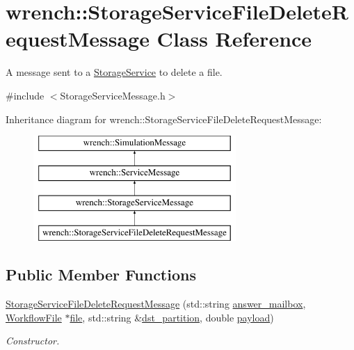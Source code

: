 \hypertarget{classwrench_1_1_storage_service_file_delete_request_message}{}\section{wrench\+:\+:Storage\+Service\+File\+Delete\+Request\+Message Class Reference}
\label{classwrench_1_1_storage_service_file_delete_request_message}


A message sent to a \hyperlink{classwrench_1_1_storage_service}{Storage\+Service} to delete a file.  




{\ttfamily \#include $<$Storage\+Service\+Message.\+h$>$}

Inheritance diagram for wrench\+:\+:Storage\+Service\+File\+Delete\+Request\+Message\+:\begin{figure}[H]
\begin{center}
\leavevmode
\includegraphics[height=4.000000cm]{classwrench_1_1_storage_service_file_delete_request_message}
\end{center}
\end{figure}
\subsection*{Public Member Functions}
\begin{DoxyCompactItemize}
\item 
\hyperlink{classwrench_1_1_storage_service_file_delete_request_message_aeb2a3dbe04ee5e659c2c77018a4d144d}{Storage\+Service\+File\+Delete\+Request\+Message} (std\+::string \hyperlink{classwrench_1_1_storage_service_file_delete_request_message_a177fd6bf8eb030201630fd55d81eef9d}{answer\+\_\+mailbox}, \hyperlink{classwrench_1_1_workflow_file}{Workflow\+File} $\ast$\hyperlink{classwrench_1_1_storage_service_file_delete_request_message_ac971507bc489c43d33b52ae6006bbe39}{file}, std\+::string \&\hyperlink{classwrench_1_1_storage_service_file_delete_request_message_ac0af21407ec5e7414fb16e78c12a8000}{dst\+\_\+partition}, double \hyperlink{classwrench_1_1_simulation_message_a914f2732713f7c02898e66f05a7cb8a1}{payload})
\begin{DoxyCompactList}\small\item\em Constructor. \end{DoxyCompactList}\end{DoxyCompactItemize}
